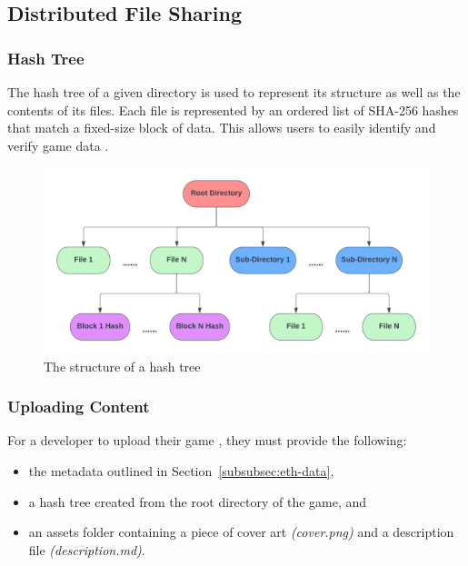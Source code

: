 
\subsection*{Distributed File Sharing}
\label{subsec:design-p2p}

\subsubsection*{Hash Tree}
\label{subsubsec:hash-tree}

The hash tree of a given directory is used to represent its structure as well as the contents of its files. Each file is represented by an ordered list of SHA-256 hashes that match a fixed-size block of data. This allows users to easily identify and verify game data .

\begin{figure}[ht]
  \centering
  \includegraphics[width=.85\textwidth]{assets/images/diagrams/block-body.png}
  \caption{The structure of a hash tree}
  \label{fig:hash-storage}
\end{figure}

\subsubsection*{Uploading Content}
\label{subsubsec:upload-content}

For a developer to upload their game , they must provide the following:

\begin{itemize}
  \item the metadata outlined in Section~\ref{subsubsec:eth-data},
  \item a hash tree created from the root directory of the game, and
  \item an assets folder containing a piece of cover art \textit{(cover.png)} and a description file \textit{(description.md)}.
\end{itemize}

